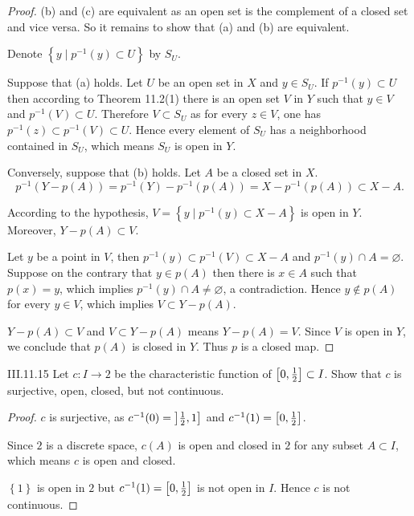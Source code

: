 \begin{proof}
	(b) and (c) are equivalent as an open set is the complement of a closed set and vice versa. So it remains to show that (a) and (b) are equivalent.

	Denote \( \left\{ y \mid p^{-1}(y) \subset U \right\} \) by \( S_{U} \).

	Suppose that (a) holds. Let \( U \) be an open set in \( X \) and \( y \in S_{U} \). If \( p^{-1}(y) \subset U \) then according to Theorem 11.2(1) there is an open set \( V \) in \( Y \) such that \( y \in V \) and \( p^{-1}(V) \subset U \). Therefore \( V \subset S_{U} \) as for every \( z \in V \), one has \( p^{-1}(z) \subset p^{-1}(V) \subset U \). Hence every element of \( S_{U} \) has a neighborhood contained in \( S_{U}\), which means \( S_{U} \) is open in \( Y \).

	Conversely, suppose that (b) holds. Let \( A \) be a closed set in \( X \).
	\[
		p^{-1}(Y - p(A)) = p^{-1}(Y) - p^{-1}(p(A)) = X - p^{-1}(p(A)) \subset X - A.
	\]

	According to the hypothesis, \( V = \left\{ y \mid p^{-1}(y) \subset X - A \right\} \) is open in \( Y \). Moreover, \( Y - p(A) \subset V \).

	Let \( y \) be a point in \( V \), then \( p^{-1}(y) \subset p^{-1}(V) \subset X - A \) and \( p^{-1}(y) \cap A = \varnothing \). Suppose on the contrary that \( y \in p(A) \) then there is \( x \in A \) such that \( p(x) = y \), which implies \( p^{-1}(y) \cap A \ne \varnothing \), a contradiction. Hence \( y \notin p(A) \) for every \( y \in V \), which implies \( V \subset Y - p(A) \).

	\( Y - p(A) \subset V \) and \( V \subset Y - p(A) \) means \( Y - p(A) = V \). Since \( V \) is open in \( Y \), we conclude that \( p(A) \) is closed in \( Y \). Thus \( p \) is a closed map.
\end{proof}

\begin{problem}{III.11.15}
Let \( c: I \to 2 \) be the characteristic function of \(\left\lbrack{0, \frac{1}{2}}\right\rbrack \subset I \). Show that \( c \) is surjective, open, closed, but not continuous.
\end{problem}

\begin{proof}
	\( c \) is surjective, as \( c^{-1}(0) = \left\rbrack{\frac{1}{2}, 1}\right\rbrack \) and \( c^{-1}(1) = \left\lbrack{0, \frac{1}{2}}\right\rbrack \).

	Since \(2\) is a discrete space, \( c(A) \) is open and closed in \( 2 \) for any subset \( A \subset I \), which means \( c \) is open and closed.

	\( \left\{ 1 \right\} \) is open in \( 2 \) but \( c^{-1}(1) = \left\lbrack{0, \frac{1}{2}}\right\rbrack \) is not open in \( I \). Hence \(c\) is not continuous.
\end{proof}

